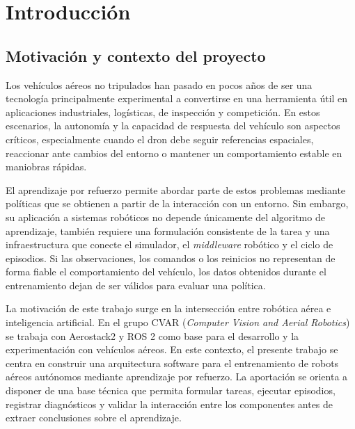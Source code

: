 \chapter{Introducción} \label{chp:intro}


\section{Motivación y contexto del proyecto} \label{sct:intro:motivacion}

Los vehículos aéreos no tripulados han pasado en pocos años de ser una
tecnología principalmente experimental a convertirse en una herramienta útil en
aplicaciones industriales, logísticas, de inspección y competición. En estos
escenarios, la autonomía y la capacidad de respuesta del vehículo son aspectos
críticos, especialmente cuando el dron debe seguir referencias espaciales,
reaccionar ante cambios del entorno o mantener un comportamiento estable en
maniobras rápidas.

El aprendizaje por refuerzo permite abordar parte de estos problemas mediante
políticas que se obtienen a partir de la interacción con un entorno. Sin
embargo, su aplicación a sistemas robóticos no depende únicamente del algoritmo
de aprendizaje, también requiere una formulación consistente de la tarea y una
infraestructura que conecte el simulador, el \emph{middleware} robótico y el
ciclo de episodios. Si las observaciones, los comandos o los reinicios no
representan de forma fiable el comportamiento del vehículo, los datos obtenidos
durante el entrenamiento dejan de ser válidos para evaluar una política.

La motivación de este trabajo surge en la intersección entre robótica aérea e
inteligencia artificial. En el grupo CVAR (\emph{Computer Vision and Aerial
Robotics}) se trabaja con Aerostack2 y ROS 2 como base para el desarrollo y la
experimentación con vehículos aéreos. En este contexto, el presente trabajo se
centra en construir una arquitectura software para el entrenamiento de robots aéreos autónomos mediante
aprendizaje por refuerzo. La aportación se orienta a disponer de
una base técnica que permita formular tareas, ejecutar episodios, registrar
diagnósticos y validar la interacción entre los componentes antes de extraer
conclusiones sobre el aprendizaje.


